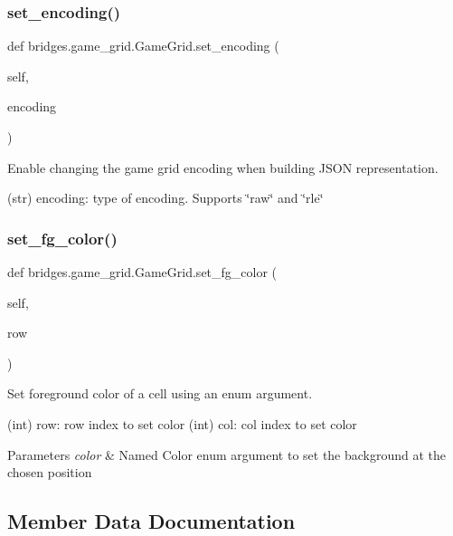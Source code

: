 \subsubsection{\texorpdfstring{set\+\_\+encoding()}{set\_encoding()}}
{\footnotesize\ttfamily def bridges.\+game\+\_\+grid.\+Game\+Grid.\+set\+\_\+encoding (\begin{DoxyParamCaption}\item[{}]{self,  }\item[{}]{encoding }\end{DoxyParamCaption})}



Enable changing the game grid encoding when building J\+S\+ON representation. 

(str) encoding\+: type of encoding. Supports \char`\"{}raw\char`\"{} and \char`\"{}rle\char`\"{} \mbox{\label{classbridges_1_1game__grid_1_1_game_grid_a9f9040a6b8b88d7d7c74194c22890047}} 
\subsubsection{\texorpdfstring{set\+\_\+fg\+\_\+color()}{set\_fg\_color()}}
{\footnotesize\ttfamily def bridges.\+game\+\_\+grid.\+Game\+Grid.\+set\+\_\+fg\+\_\+color (\begin{DoxyParamCaption}\item[{}]{self,  }\item[{}]{row }\end{DoxyParamCaption})}



Set foreground color of a cell using an enum argument. 

(int) row\+: row index to set color (int) col\+: col index to set color 
\begin{DoxyParams}{Parameters}
{\em color} & Named Color enum argument to set the background at the chosen position \\
\hline
\end{DoxyParams}


\subsection{Member Data Documentation}
\mbox{\label{classbridges_1_1game__grid_1_1_game_grid_abfef04b7aed487dd86d9c0c2ddeda881}} 
